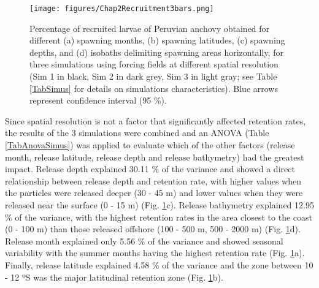 \begin{figure}[ht]
	\texttt{[image: figures/Chap2Recruitment3bars.png]}
	\centering
	\caption{Percentage of recruited larvae of Peruvian anchovy obtained for different (a) spawning months, (b) spawning latitudes, (c) spawning depths, and (d) isobaths delimiting spawning areas horizontally, for three simulations using forcing fields at different spatial resolution (Sim 1 in black, Sim 2 in dark grey, Sim 3 in light gray; see Table \ref{TabSimus} for details on simulations characteristics). Blue arrows represent confidence interval (95 \%).}
	\label{Chap2Recruitment3bars}
\end{figure}

Since spatial resolution is not a factor that significantly affected retention rates, the results of the 3 simulations were combined and an ANOVA (Table \ref{TabAnovaSimus}) was applied to evaluate which of the other factors (release month, release latitude, release depth and release bathymetry) had the greatest impact. Release depth explained 30.11 \% of the variance and showed a direct relationship between release depth and retention rate, with higher values when the particles were released deeper (30 - 45 m) and lower values when they were released near the surface (0 - 15 m) (Fig. \ref{Chap2Recruitment3bars}c). Release bathymetry explained 12.95 \% of the variance, with the highest retention rates in the area closest to the coast (0 - 100 m) than those released offshore (100 - 500 m, 500 - 2000 m) (Fig. \ref{Chap2Recruitment3bars}d). Release month explained only 5.56 \% of the variance and showed seasonal variability with the summer months having the highest retention rate (Fig. \ref{Chap2Recruitment3bars}a). Finally, release latitude explained 4.58 \% of the variance and the zone between 10 - 12 ºS was the major latitudinal retention zone (Fig. \ref{Chap2Recruitment3bars}b).\\

